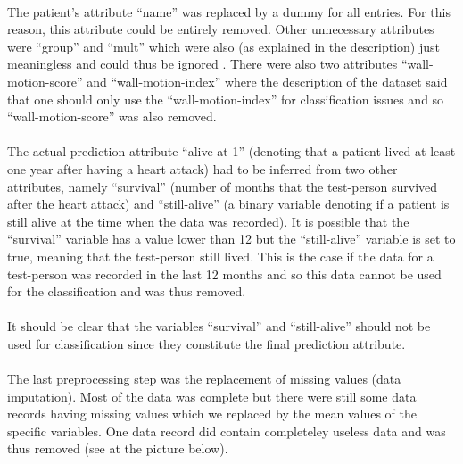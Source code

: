 \documentclass[paper=a4, fontsize=11pt]{scrartcl} %
\numberwithin{equation}{section} %
\numberwithin{figure}{section} %
\numberwithin{table}{section} %
\begin{document}
\paragraph{}The patient's attribute ``name'' was replaced by a dummy for all entries. For this reason, this attribute could be entirely removed. Other unnecessary attributes were ``group'' and ``mult'' which were also (as explained in the description) just meaningless and could thus be ignored \cite{uci-repo}. There were also two attributes ``wall-motion-score'' and ``wall-motion-index'' where the description of the dataset said that one should only use the ``wall-motion-index'' for classification issues and so ``wall-motion-score'' was also removed.

\paragraph{}The actual prediction attribute ``alive-at-1'' (denoting that a patient lived at least one year after having a heart attack) had to be inferred from two other attributes, namely ``survival'' (number of months that the test-person survived after the heart attack) and ``still-alive'' (a binary variable denoting if a patient is still alive at the time when the data was recorded). It is possible that the ``survival'' variable has a value lower than 12 but the ``still-alive'' variable is set to true, meaning that the test-person still lived. This is the case if the data for a test-person was recorded in the last 12 months and so this data cannot be used for the classification and was thus removed.

\paragraph{}It should be clear that the variables ``survival'' and ``still-alive'' should not be used for classification since they constitute the final prediction attribute.

\paragraph{}The last preprocessing step was the replacement of missing values (data imputation). Most of the data was complete but there were still some data records having missing values which we replaced by the mean values of the specific variables. One data record did contain completeley useless data and was thus removed (see at the picture below).
\end{document}
